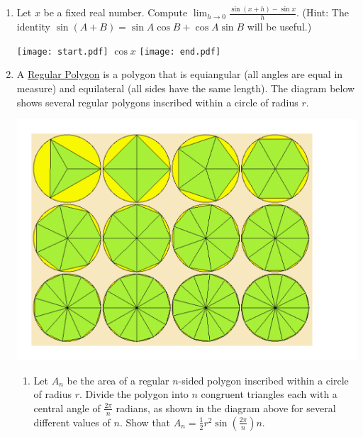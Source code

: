 \documentclass[12pt]{article}
\begin{document}
\begin{enumerate}
\item Let $x$ be a fixed real number.  Compute $\lim_{h \rightarrow 0}\frac{\sin{(x+h)}-\sin{x}}{h}$.  (Hint: The identity $\sin{(A+B)}=\sin{A}\cos{B}+\cos{A}\sin{B}$ will be useful.)

\texttt{[image: start.pdf]}
{{$\cos{x}$}}
\texttt{[image: end.pdf]}



\item A \underline{Regular Polygon} is a polygon that is equiangular (all angles are equal in measure) and equilateral (all sides have the same length).  The diagram below shows several regular polygons inscribed within a circle of radius $r$.

\begin{center}

\includegraphics[scale=0.3]{Inscribed.pdf}

\end{center}

\begin{enumerate}

\item Let $A_n$ be the area of a regular $n$-sided polygon inscribed within a circle of radius $r$.  Divide the polygon into $n$ congruent triangles each with a central angle of $\frac{2\pi}{n}$ radians, as shown in the diagram above for several different values of $n$.    Show that $A_n=\frac{1}{2}r^2 \sin{\left(\frac{2\pi}{n}\right)} n$.


\end{enumerate}
\end{enumerate}
\end{document}

